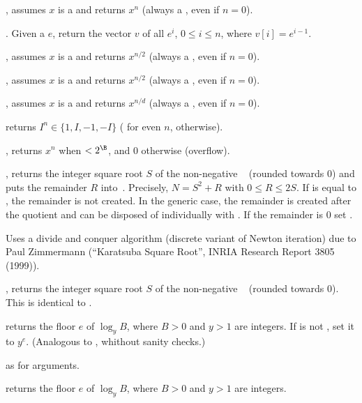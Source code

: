 , assumes $x$ is a  and returns $x^n$
(always a , even if $n = 0$).

. Given a  $e$, return the vector
$v$ of all $e^i$, $0 \leq i \leq n$, where $v[i] = e^{i-1}$.

, assumes $x$ is a  and returns
$x^{n/2}$ (always a , even if $n = 0$).

, assumes $x$ is a  and returns
$x^{n/2}$ (always a , even if $n = 0$).

, assumes $x$ is a  and
returns $x^{n/d}$ (always a , even if $n = 0$).

 returns $I^n\in\{1,I,-1,-I\}$ ( for even $n$,
 otherwise).

, returns $x^n$ when $< 2^\B$, and $0$
otherwise (overflow).

, returns the integer square root $S$ of
the non-negative ~ (rounded towards 0) and puts the remainder
$R$ into~. Precisely, $N = S^2 + R$ with $0\leq R \leq 2S$. If
 is equal to , the remainder is not created. In the generic
case, the remainder is created after the quotient and can be disposed of
individually with . If the remainder is $0$ set .

Uses a divide and conquer algorithm (discrete variant of Newton iteration)
due to Paul Zimmermann (``Karatsuba Square Root'', INRIA Research Report 3805
(1999)).

, returns the integer square root $S$ of
the non-negative ~ (rounded towards 0). This is identical
to .

returns the floor $e$ of $\log_y B$, where $B > 0$ and $y > 1$ are integers.
If  is not , set it to $y^e$. (Analogous to ,
whithout sanity checks.)

 as  for
 arguments.

 returns the floor $e$ of $\log_y B$, where
$B > 0$ and $y > 1$ are integers.

